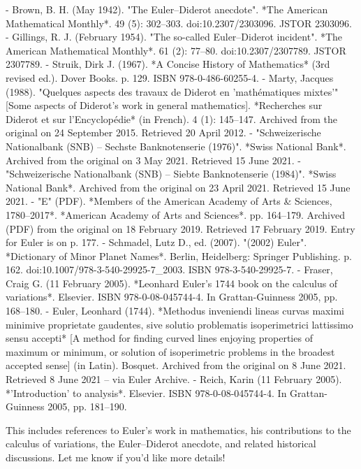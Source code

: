 \begin{enumerate}
- Brown, B. H. (May 1942). "The Euler–Diderot anecdote". *The American Mathematical Monthly*. 49 (5): 302–303. doi:10.2307/2303096. JSTOR 2303096.
- Gillings, R. J. (February 1954). "The so-called Euler–Diderot incident". *The American Mathematical Monthly*. 61 (2): 77–80. doi:10.2307/2307789. JSTOR 2307789.
- Struik, Dirk J. (1967). *A Concise History of Mathematics* (3rd revised ed.). Dover Books. p. 129. ISBN 978-0-486-60255-4.
- Marty, Jacques (1988). "Quelques aspects des travaux de Diderot en 'mathématiques mixtes'" [Some aspects of Diderot's work in general mathematics]. *Recherches sur Diderot et sur l'Encyclopédie* (in French). 4 (1): 145–147. Archived from the original on 24 September 2015. Retrieved 20 April 2012.
- "Schweizerische Nationalbank (SNB) – Sechste Banknotenserie (1976)". *Swiss National Bank*. Archived from the original on 3 May 2021. Retrieved 15 June 2021.
- "Schweizerische Nationalbank (SNB) – Siebte Banknotenserie (1984)". *Swiss National Bank*. Archived from the original on 23 April 2021. Retrieved 15 June 2021.
- "E" (PDF). *Members of the American Academy of Arts & Sciences, 1780–2017*. *American Academy of Arts and Sciences*. pp. 164–179. Archived (PDF) from the original on 18 February 2019. Retrieved 17 February 2019. Entry for Euler is on p. 177.
- Schmadel, Lutz D., ed. (2007). "(2002) Euler". *Dictionary of Minor Planet Names*. Berlin, Heidelberg: Springer Publishing. p. 162. doi:10.1007/978-3-540-29925-7_2003. ISBN 978-3-540-29925-7.
- Fraser, Craig G. (11 February 2005). *Leonhard Euler's 1744 book on the calculus of variations*. Elsevier. ISBN 978-0-08-045744-4. In Grattan-Guinness 2005, pp. 168–180.
- Euler, Leonhard (1744). *Methodus inveniendi lineas curvas maximi minimive proprietate gaudentes, sive solutio problematis isoperimetrici lattissimo sensu accepti* [A method for finding curved lines enjoying properties of maximum or minimum, or solution of isoperimetric problems in the broadest accepted sense] (in Latin). Bosquet. Archived from the original on 8 June 2021. Retrieved 8 June 2021 – via Euler Archive.
- Reich, Karin (11 February 2005). *'Introduction' to analysis*. Elsevier. ISBN 978-0-08-045744-4. In Grattan-Guinness 2005, pp. 181–190.

This includes references to Euler's work in mathematics, his contributions to the calculus of variations, the Euler–Diderot anecdote, and related historical discussions. Let me know if you'd like more details!

\end{enumerate}